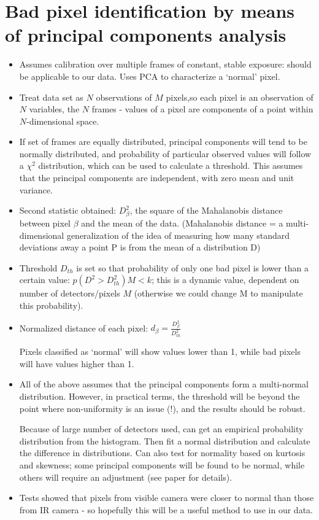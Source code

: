 \documentclass[10pt,fleqn]{article}
\begin{document}
\section{Bad pixel identification by means of principal components analysis \cite{Alda2002}}

\begin{itemize}
\item Assumes calibration over multiple frames of constant, stable exposure: should be applicable to our data. Uses PCA to characterize a `normal' pixel.

\item Treat data set as $N$ observations of $M$ pixels,so each pixel is an observation of $N$ variables, the $N$ frames - values of a pixel are components of a point within $N$-dimensional space.

\item If set of frames are equally distributed, principal components will tend to be normally distributed, and probability of particular observed values will follow a $\chi^2$ distribution, which can be used to calculate a threshold. This assumes that the principal components are independent, with zero mean and unit variance.

\item Second statistic obtained: $D^2_\beta$, the square of the Mahalanobis distance between pixel $\beta$ and the mean of the data. (Mahalanobis distance = a multi-dimensional generalization of the idea of measuring how many standard deviations away a point P is from the mean of a distribution D)

\item Threshold $D_{th}$ is set so that probability of only one bad pixel is lower than a certain value: $p(D^2 > D_{th}^2)M < k$; this is a dynamic value, dependent on number of detectors/pixels $M$ (otherwise we could change M to manipulate this probability).

\item Normalized distance of each pixel: $d_\beta = \frac{D_\beta^2}{D_{th}^2}$

Pixels classified as `normal' will show values lower than 1, while bad pixels will have values higher than 1.

\item All of the above assumes that the principal components form a multi-normal distribution. However, in practical terms, the threshold will be beyond the point where non-uniformity is an issue (!), and the results should be robust.

Because of large number of detectors used, can get an empirical probability distribution from the histogram. Then fit a normal distribution and calculate the difference in distributions. Can also test for normality based on kurtosis and skewness; some principal components will be found to be normal, while others will require an adjustment (see paper for details).

\item Tests showed that pixels from visible camera were closer to normal than those from IR camera - so hopefully this will be a useful method to use in our data.

\end{itemize}
\end{document}

